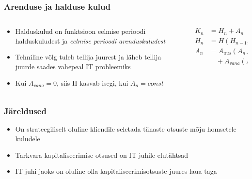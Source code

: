 \begin{frame}[fragile]
  \frametitle{Arenduse ja halduse kulud}
  	\begin{columns}[t]
		\begin{column}[T]{6.5cm}
			\begin{itemize}
				\item Halduskulud on funktsioon eelmise perioodi halduskuludest ja \emph{eelmise perioodi arenduskuludest}
				\item Tehniline võlg tuleb tellija juurest ja läheb tellija juurde saades vahepeal IT probleemiks
				\item Kui $A_{vana}=0$, siis H kasvab isegi, kui $A_n=const$
			\end{itemize}
		\end{column}
		\begin{column}[T]{3.5cm}
			\begin{align}
				K_n &= H_n+A_n \nonumber \\
			    H_n &= H(H_{n-1}, A_{n-1}, I_n) \nonumber\\
			    A_n &= A_{uus}(A_{n-1}, I_n) \nonumber \\
			    &\quad {} + A_{vana}(A_{n-1}, I_n) \nonumber
		    \end{align}
		\end{column}
	\end{columns}
\end{frame}

\begin{frame}[fragile]
  \frametitle{Järeldused}
	\begin{itemize}
		\item On strateegiliselt oluline kliendile seletada tänaste otsuste mõju homsetele kuludele
		\item Tarkvara kapitaliseerimise otsused on IT-juhile elutähtsad
		\item IT-juhi jaoks on oluline olla kapitaliseerimisotsuste juures laua taga
	\end{itemize}
\end{frame}


